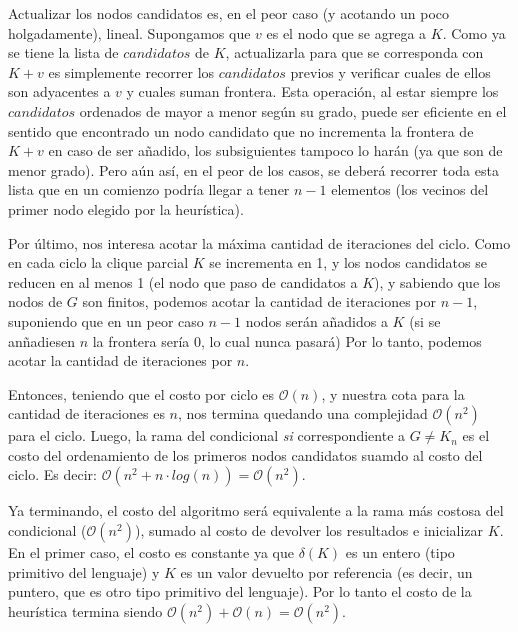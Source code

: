 \par Actualizar los nodos candidatos es, en el peor caso (y acotando un poco holgadamente),
    lineal. Supongamos que $v$ es el nodo que se agrega a $K$. Como ya se tiene
    la lista de $candidatos$ de $K$, actualizarla para que se corresponda con
    $K+v$ es simplemente recorrer los $candidatos$ previos y verificar cuales de
    ellos son adyacentes a $v$ y cuales suman frontera. Esta operaci\'on, al
    estar siempre los $candidatos$ ordenados de mayor a menor seg\'un su grado,
    puede ser eficiente en el sentido que encontrado un nodo candidato que 
    no incrementa la frontera de $K+v$ en caso de ser a\~nadido, los subsiguientes
    tampoco lo har\'an (ya que son de menor grado). Pero a\'un as\'i, en el
    peor de los casos, se deber\'a recorrer toda esta lista que en un comienzo
    podr\'ia llegar a tener $n-1$ elementos (los vecinos del primer nodo
    elegido por la heur\'istica).

\par Por \'ultimo, nos interesa acotar la m\'axima cantidad de iteraciones del ciclo.
    Como en cada ciclo la clique parcial $K$ se incrementa en 1, y los nodos
    candidatos se reducen en al menos 1 (el nodo que paso de candidatos a $K$), y
    sabiendo que los nodos de $G$ son finitos, podemos acotar la cantidad de
    iteraciones por $n-1$, suponiendo que en un peor caso $n-1$ nodos ser\'an
    a\~nadidos a $K$ (si se an\~nadiesen $n$ la frontera ser\'ia 0, lo cual
    nunca pasar\'a)  Por lo tanto, podemos acotar la cantidad de iteraciones
    por $n$.

\par Entonces, teniendo que el costo por ciclo es $\mathcal O(n)$, y nuestra
    cota para la cantidad de iteraciones es $n$, nos termina quedando una complejidad
    $\mathcal O(n^2)$ para el ciclo. Luego, la rama del condicional \emph{si}
    correspondiente a $G \neq K_n$ es el costo del ordenamiento de los primeros
    nodos candidatos suamdo al costo del ciclo. Es decir: $\mathcal O(n^2 + n\cdot log(n))
    = \mathcal O(n^2)$.

\par Ya terminando, el costo del algoritmo ser\'a equivalente a la rama m\'as
    costosa del condicional ($\mathcal O(n^2)$), sumado al costo de devolver
    los resultados e inicializar $K$. En el primer caso, el costo es constante
    ya que $\delta(K)$ es un entero (tipo primitivo del lenguaje) y $K$ es
    un valor devuelto por referencia (es decir, un puntero, que es otro tipo
    primitivo del lenguaje). Por lo tanto el costo de la heur\'istica termina
    siendo $\mathcal O(n^2) + \mathcal O(n) = \mathcal O(n^2)$.

